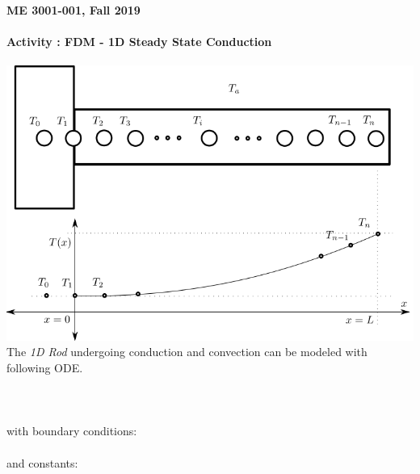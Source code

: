 \documentclass[11pt]{article}
\begin{document}
	\textbf{\LARGE ME 3001-001, Fall 2019} \\\\
	\textbf{\LARGE Activity : FDM - 1D Steady State Conduction } \\\\

		

		\includegraphics[scale=.5]{hw7_fig1.png}\\

		The {\it 1D Rod} undergoing conduction and convection can be modeled with following ODE. \\\\
 \\\\
with boundary conditions: \\\\
and constants:  
 
		
\end{document}
